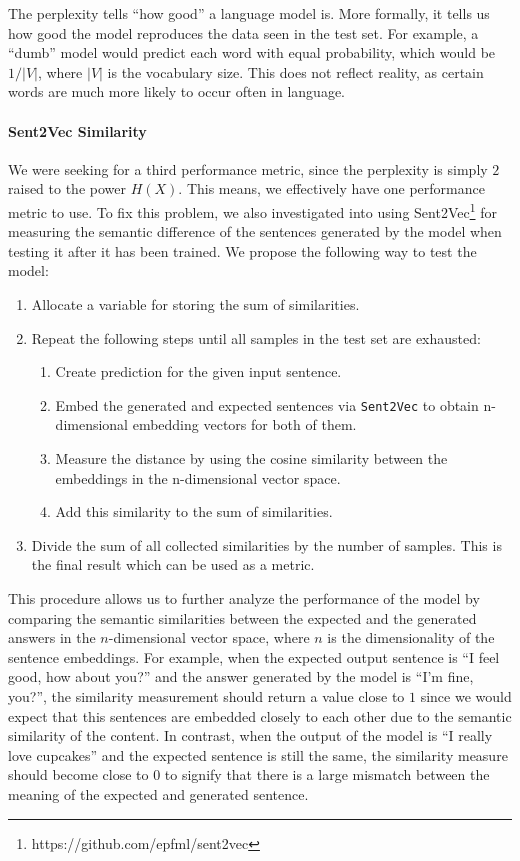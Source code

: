 The perplexity tells ``how good'' a language model is. More formally, it tells us how good the model reproduces the data seen in the test set. For example, a ``dumb'' model would predict each word with equal probability, which would be $1/|V|$, where $|V|$ is the vocabulary size. This does not reflect reality, as certain words are much more likely to occur often in language.

\paragraph{Sent2Vec Similarity}\label{fundamentals:sent2vec_test} We were seeking for a third performance metric, since the perplexity is simply $2$ raised to the power $H(X)$. This means, we effectively have one performance metric to use. To fix this problem, we also investigated into using Sent2Vec\footnote{https://github.com/epfml/sent2vec} \cite{Pgj:2017} for measuring the semantic difference of the sentences generated by the model when testing it after it has been trained. We propose the following way to test the model:

\begin{enumerate}[noitemsep]
	\item Allocate a variable for storing the sum of similarities.
	\item Repeat the following steps until all samples in the test set are exhausted:
	\begin{enumerate}[noitemsep]
		\item Create prediction for the given input sentence.
		\item Embed the generated and expected sentences via \texttt{Sent2Vec} to obtain n-dimensional embedding vectors for both of them.
		\item Measure the distance by using the cosine similarity between the embeddings in the n-dimensional vector space.
		\item Add this similarity to the sum of similarities.
	\end{enumerate}
	\item Divide the sum of all collected similarities by the number of samples. This is the final result which can be used as a metric.
\end{enumerate}

This procedure allows us to further analyze the performance of the model by comparing the semantic similarities between the expected and the generated answers in the $n$-dimensional vector space, where $n$ is the dimensionality of the sentence embeddings. For example, when the expected output sentence is ``I feel good, how about you?'' and the answer generated by the model is ``I'm fine, you?'', the similarity measurement should return a value close to $1$ since we would expect that this sentences are embedded closely to each other due to the semantic similarity of the content. In contrast, when the output of the model is ``I really love cupcakes'' and the expected sentence is still the same, the similarity measure should become close to $0$ to signify that there is a large mismatch between the meaning of the expected and generated sentence.

